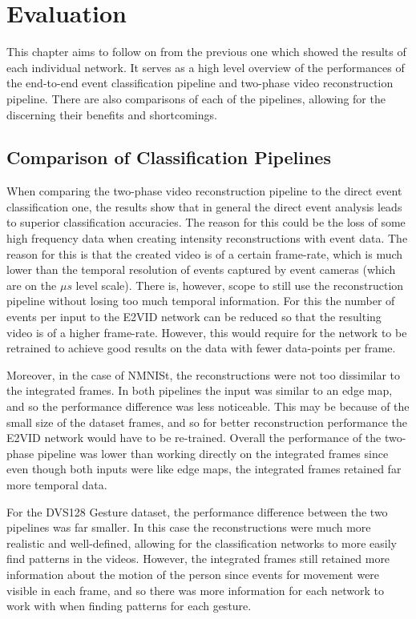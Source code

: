 \chapter{Evaluation} \label{chap:evaluation}

This chapter aims to follow on from the previous one which showed the results of each individual network. It serves as a high level overview of the performances of the end-to-end event classification pipeline and two-phase video reconstruction pipeline. There are also comparisons of each of the pipelines, allowing for the discerning their benefits and shortcomings.

\section{Comparison of Classification Pipelines}

When comparing the two-phase video reconstruction pipeline to the direct event classification one, the results show that in general the direct event analysis leads to superior classification accuracies. The reason for this could be the loss of some high frequency data when creating intensity reconstructions with event data. The reason for this is that the created video is of a certain frame-rate, which is much lower than the temporal resolution of events captured by event cameras (which are on the $ \mu s $ level scale). There is, however, scope to still use the reconstruction pipeline without losing too much temporal information. For this the number of events per input to the E2VID network can be reduced so that the resulting video is of a higher frame-rate. However, this would require for the network to be retrained to achieve good results on the data with fewer data-points per frame.

Moreover, in the case of NMNISt, the reconstructions were not too dissimilar to the integrated frames. In both pipelines the input was similar to an edge map, and so the performance difference was less noticeable. This may be because of the small size of the dataset frames, and so for better reconstruction performance the E2VID network would have to be re-trained. Overall the performance of the two-phase pipeline was lower than working directly on the integrated frames since even though both inputs were like edge maps, the integrated frames retained far more temporal data.

For the DVS128 Gesture dataset, the performance difference between the two pipelines was far smaller. In this case the reconstructions were much more realistic and well-defined, allowing for the classification networks to more easily find patterns in the videos. However, the integrated frames still retained more information about the motion of the person since events for movement were visible in each frame, and so there was more information for each network to work with when finding patterns for each gesture.

